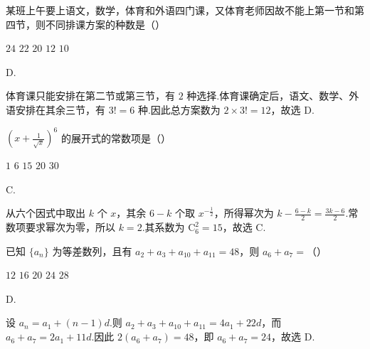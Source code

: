 \documentclass[UTF8,a4paper,oneside,11pt]{ctexbook}
\begin{document}
\begin{problem}

某班上午要上语文，数学，体育和外语四门课，又体育老师因故不能上第一节和第四节，则不同排课方案的种数是（\quad）

\choicesfive
    {\(24\)}
    {\(22\)}
    {\(20\)}
    {\(12\)}
    {\(10\)}
\end{problem}

\begin{answer}
D.
\end{answer}

\begin{solution}
体育课只能安排在第二节或第三节，有 \(2\) 种选择.体育课确定后，语文、数学、外语安排在其余三节，有 \(3!=6\) 种.因此总方案数为 \(2\times3!=12\)，故选 D.
\end{solution}

\begin{problem}

\(\left(x+\frac{1}{\sqrt{x}}\right)^{6} \) 的展开式的常数项是（\quad）

\choicesfive
    {\(1\)}
    {\(6\)}
    {\(15\)}
    {\(20\)}
    {\(30\)}
\end{problem}

\begin{answer}
C.
\end{answer}

\begin{solution}
从六个因式中取出 \(k\) 个 \(x\)，其余 \(6-k\) 个取 \(x^{-\frac{1}{2}}\)，所得幂次为 \(k-\frac{6-k}{2}=\frac{3k-6}{2}\).常数项要求幂次为零，所以 \(k=2\).其系数为 \(\mathrm C_6^2=15\)，故选 C.
\end{solution}

\begin{problem}

已知 \(\{a_{n}\} \) 为等差数列，且有 \(a_{2} + a_{3} + a_{10} + a_{11} = 48 \)，则 \(a_{6} + a_{7} = \)（\quad）

\choicesfive
    {\(12\)}
    {\(16\)}
    {\(20\)}
    {\(24\)}
    {\(28\)}
\end{problem}

\begin{answer}
D.
\end{answer}

\begin{solution}
设 \(a_n=a_1+(n-1)d\).则 \(a_2+a_3+a_{10}+a_{11}=4a_1+22d\)，而 \(a_6+a_7=2a_1+11d\).因此 \(2(a_6+a_7)=48\)，即 \(a_6+a_7=24\)，故选 D.
\end{solution}
\end{document}
